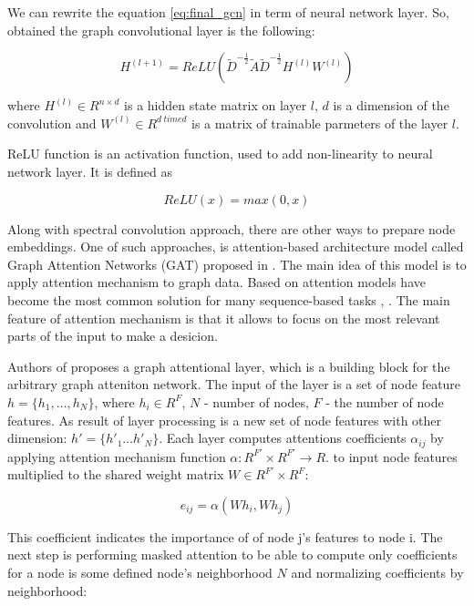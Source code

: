 We can rewrite the equation \ref{eq:final_gcn} in term of neural network layer. So, obtained the graph convolutional layer 
is the following:

\begin{equation}
    H^{(l+1)} = ReLU(\tilde{D}^{-\frac{1}{2}}\tilde{A}\tilde{D}^{-\frac{1}{2}}H^{(l)}W^{(l)})
    \label{eq:final_gcn_nn}
\end{equation}

where $H^{(l)} \in R^{n \times d}$ is a hidden state matrix on layer $l$, $d$ is a dimension
of the convolution and $W^{(l)} \in R^{d \ time d}$ is a matrix of trainable parmeters of the layer $l$.

ReLU function is an activation function, used to add non-linearity to neural network layer. It is defined as

\begin{equation}
    ReLU(x) = max(0,x)
    \label{eq:relu}
\end{equation}


Along with spectral convolution approach, there are other ways to prepare node embeddings. One of such approaches, is 
attention-based architecture model called Graph Attention Networks (GAT) proposed in \cite{GAT}.
The main idea of this model is to apply attention mechanism to graph data. Based on attention models have become 
the most common solution for many sequence-based tasks \cite{GATintro1}, \cite{GATintro2}.
The main feature of attention mechanism is that it allows to focus on the most relevant parts of the input 
to make a desicion.

Authors of \cite{GAT} proposes a graph attentional layer, which is a building block for the arbitrary graph atteniton network.
The input of the layer is a set of node feature $ h=\{ h_1,\dots , h_N \}$, where $h_i \in R^F$, $N$ - number of nodes, $F$ - the number
of node features. As result of layer processing is a new set of node features with other dimension: $h' = \{ h'_1 \dots h'_N \}$.
Each layer computes attentions coefficients $\alpha_{ij}$ by applying attention mechanism function $\alpha : R^{F'} \times R^{F'} \rightarrow R$.
to input node features multiplied to the shared weight matrix $W \in R^{F'} \times R^{F}$:

\begin{equation}
    e_{ij} = \alpha(Wh_i, Wh_j)
    \label{eq:att_coeff}
\end{equation}

This coefficient indicates the importance of of node j's features to node i. The next step is performing masked attention to 
be able to compute only coefficients for a node is some defined node's neighborhood $N$ and normalizing coefficients by neighborhood:


